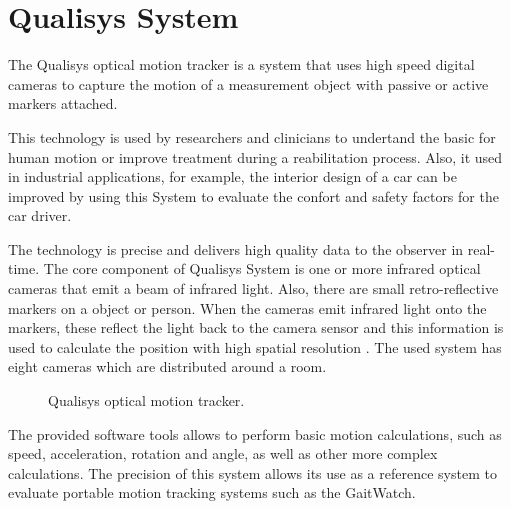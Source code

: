 \section{Qualisys System}
The Qualisys optical motion tracker is a system that uses high speed digital cameras to capture the motion of a measurement object with passive or active markers attached.  \cite{OlivaresBotzel2013}

This technology is used by researchers and clinicians to undertand the basic for human motion or improve treatment during a reabilitation process. Also, it used in industrial applications, for example, the interior design of a car can be improved by using this System to evaluate the confort and safety factors for the car driver. \cite{Qualisys}

The technology is precise and delivers high quality data to the observer in real-time. The core component of Qualisys System is one or more infrared optical cameras that emit a beam of infrared light. Also, there are small retro-reflective markers on a object or person. When the cameras emit infrared light onto the markers, these reflect the light back to the camera sensor and this information is used to calculate the position with high spatial resolution  \cite{Qualisys}. The used system has eight cameras which are distributed around a room.

\begin{figure}[H]
	\centering
	\caption{Qualisys optical motion tracker.}
	\label{fig:QS}
\end{figure}

The provided software tools allows to perform basic motion calculations,
such as speed, acceleration, rotation and angle, as well as other more complex
calculations. The precision of this system allows its use as a reference system to evaluate portable motion tracking systems such as the GaitWatch.  \cite{OlivaresBotzel2013}
